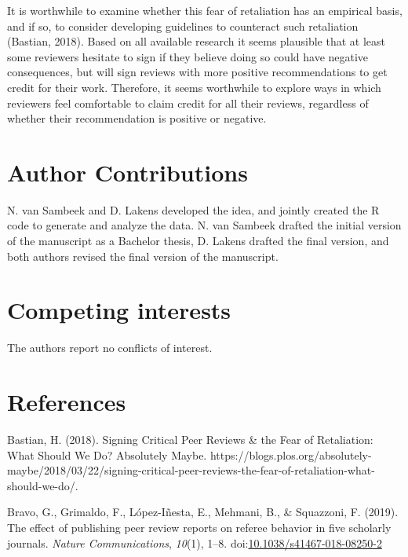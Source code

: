 \documentclass[,jou, a4paper,floatsintext]{apa6}
\begin{document}
It is worthwhile to examine whether this fear of retaliation has an empirical basis, and if so, to consider developing guidelines to counteract such retaliation (Bastian, 2018). Based on all available research it seems plausible that at least some reviewers hesitate to sign if they believe doing so could have negative consequences, but will sign reviews with more positive recommendations to get credit for their work. Therefore, it seems worthwhile to explore ways in which reviewers feel comfortable to claim credit for all their reviews, regardless of whether their recommendation is positive or negative.

\hypertarget{author-contributions}{%
\section{Author Contributions}\label{author-contributions}}

N. van Sambeek and D. Lakens developed the idea, and jointly created the R code to generate and analyze the data. N. van Sambeek drafted the initial version of the manuscript as a Bachelor thesis, D. Lakens drafted the final version, and both authors revised the final version of the manuscript.

\hypertarget{competing-interests}{%
\section{Competing interests}\label{competing-interests}}

The authors report no conflicts of interest.

\hypertarget{references}{%
\section{References}\label{references}}

\setlength{\parindent}{-0.5in}
\setlength{\leftskip}{0.5in}

\hypertarget{refs}{}
\leavevmode\hypertarget{ref-bastian_signing_2018}{}%
Bastian, H. (2018). Signing Critical Peer Reviews \& the Fear of Retaliation: What Should We Do? \textbar{} Absolutely Maybe. https://blogs.plos.org/absolutely-maybe/2018/03/22/signing-critical-peer-reviews-the-fear-of-retaliation-what-should-we-do/.

\leavevmode\hypertarget{ref-bravo_effect_2019}{}%
Bravo, G., Grimaldo, F., López-Iñesta, E., Mehmani, B., \& Squazzoni, F. (2019). The effect of publishing peer review reports on referee behavior in five scholarly journals. \emph{Nature Communications}, \emph{10}(1), 1--8. doi:\href{https://doi.org/10.1038/s41467-018-08250-2}{10.1038/s41467-018-08250-2}
\end{document}
